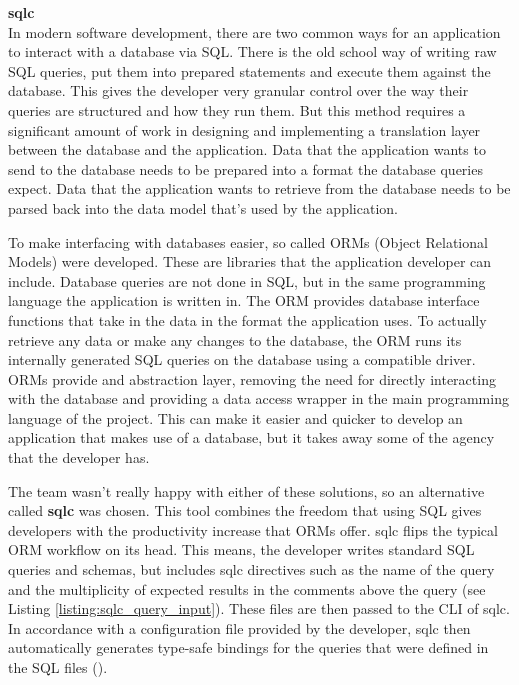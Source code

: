 \textbf{sqlc}\\
In modern software development, there are two common ways for an application to
interact with a database via SQL. There is the old school way of writing raw SQL
queries, put them into prepared statements and execute them against the
database. This gives the developer very granular control over the way their
queries are structured and how they run them. But this method requires a
significant amount of work in designing and implementing a translation layer
between the database and the application. Data that the application wants to
send to the database needs to be prepared into a format the database queries
expect. Data that the application wants to retrieve from the database needs to
be parsed back into the data model that's used by the application.

\newpage{}

To make interfacing with databases easier, so called ORMs (Object Relational
Models) were developed. These are libraries that the application developer can
include. Database queries are not done in SQL, but in the same programming
language the application is written in. The ORM provides database interface
functions that take in the data in the format the application uses. To actually
retrieve any data or make any changes to the database, the ORM runs its
internally generated SQL queries on the database using a compatible driver. ORMs
provide and abstraction layer, removing the need for directly interacting with
the database and providing a data access wrapper in the main programming
language of the project. This can make it easier and quicker to develop an
application that makes use of a database, but it takes away some of the agency
that the developer has.

The team wasn't really happy with either of these solutions, so an alternative
called \textbf{sqlc} was chosen. This tool combines the freedom that using SQL gives
developers with the productivity increase that ORMs offer. sqlc flips the
typical ORM workflow on its head. This means, the developer writes standard SQL
queries and schemas, but includes sqlc directives such as the name of the query
and the multiplicity of expected results in the comments above the query (see
Listing \ref{listing:sqlc_query_input}). These files are then passed to the CLI
of sqlc. In accordance with a configuration file provided by the developer, sqlc
then automatically generates type-safe bindings for the queries that were
defined in the SQL files (\cite{sqlc_introduction}).

